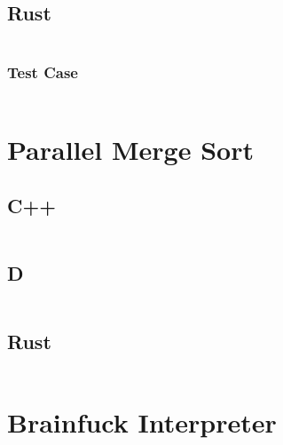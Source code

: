 \documentclass[finalcopy]{srpaper}
\begin{document}
\subsection{Rust}
\begin{mdframed}[linecolor=black]
\inputminted[fontsize=\scriptsize]{rust}{../examples/generic-array-list/generic_array_list.rs}
\end{mdframed}

\subsubsection{Test Case}
\begin{mdframed}[linecolor=black]
\inputminted[fontsize=\scriptsize]{rust}{../examples/generic-array-list/tests/generic-array-list-test.rs}
\end{mdframed}

\section{Parallel Merge Sort}
\subsection{C++}
\begin{mdframed}[linecolor=black]
\inputminted[fontsize=\scriptsize]{cpp}{../examples/parallel-merge-sort/parallel_merge_sort.cpp}
\end{mdframed}

\subsection{D}
\begin{mdframed}[linecolor=black]
\inputminted[fontsize=\scriptsize]{d}{../examples/parallel-merge-sort/parallel_merge_sort.d}
\end{mdframed}

\subsection{Rust}
\begin{mdframed}[linecolor=black]
\inputminted[fontsize=\scriptsize]{rust}{../examples/parallel-merge-sort/parallel_merge_sort.rs}
\end{mdframed}

\section{Brainfuck Interpreter}
\end{document}
